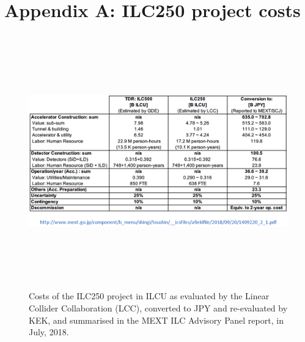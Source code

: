 \documentclass[%
 reprint,
 floatfix,
 amsmath,amssymb,
 aps,
]{revtex4-1}
\begin{document}
\newpage

%


\vspace{-.3cm}

\onecolumngrid
\newpage

\appendix


\section*{\label{Appendix1} \Large{Appendix A: ILC250 project costs}} 

\begin{figure}[ht]
 \begin{center}
 \includegraphics[width=18cm, height=11cm]{figures/Cost.png}
\caption{Costs of the ILC250 project in ILCU as evaluated by the Linear Collider Collaboration (LCC), converted to JPY and re-evaluated by KEK, and summarised in the MEXT ILC Advisory Panel report, in July, 2018.
 \label{Cost}}
 \end{center}
 \end{figure}
\end{document}
